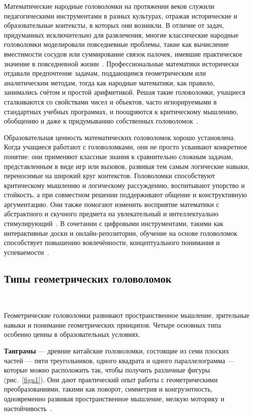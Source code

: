 \documentclass[a4paper,14pt]{extreport}
\theoremstyle{plain}
\theoremstyle{definition}
\theoremstyle{remark}
\begin{document}
Математические народные головоломки на протяжении веков служили педагогическими инструментами в разных культурах, отражая исторические и образовательные контексты, в которых они возникли. В отличие от задач, придуманных исключительно для развлечения, многие классические народные головоломки моделировали повседневные проблемы, такие как вычисление вместимости сосудов или суммирование связок палочек, имевшие практическое значение в повседневной жизни~\cite{Picciotto}. Профессиональные математики исторически отдавали предпочтение задачам, поддающимся геометрическим или аналитическим методам, тогда как народные математики, как правило, занимались счётом и простой арифметикой. Решая такие головоломки, учащиеся сталкиваются со свойствами чисел и объектов, часто игнорируемыми в стандартных учебных программах, и поощряются к критическому мышлению, обобщению и даже к придумыванию собственных головоломок~\cite{Danesi, Iortser}.

Образовательная ценность математических головоломок хорошо установлена. 
Когда учащиеся работают с головоломками, они не просто усваивают конкретное понятие: они применяют классные знания к сравнительно сложным задачам, представленным в виде игр или вызовов, развивая тем самым логические навыки, переносимые на широкий круг контекстов. Головоломки способствуют критическому мышлению и логическому рассуждению, воспитывают упорство и стойкость, а при совместном решении поддерживают общение и конструктивную аргументацию. Они также помогают изменить восприятие математики с абстрактного и скучного предмета на увлекательный и интеллектуально стимулирующий~\cite{Boaler}. 
В сочетании с цифровыми инструментами, такими как интерактивные доски и онлайн-репозитории, обучение на основе головоломок способствует повышению вовлечённости, концептуального понимания и 
успеваемости~\cite{Pramestika, Ahdhianto}.
\subsection{Типы геометрических головоломок}~\label{sec4.1.2}

Геометрические головоломки развивают пространственное мышление, зрительные навыки и понимание геометрических принципов. Четыре основных типа особенно ценны в образовательных условиях.

\textbf{Танграмы} --- древние китайские головоломки, состоящие из семи плоских частей --- пяти треугольников, одного квадрата и одного параллелограмма --- которые можно расположить так, чтобы получить различные фигуры (рис.~\ref{fign1}). Они дают практический опыт работы с геометрическими преобразованиями, такими как поворот, симметрия и конгруэнтность, одновременно развивая пространственное мышление, мелкую моторику и настойчивость~\cite{Boaler}.
\end{document}
